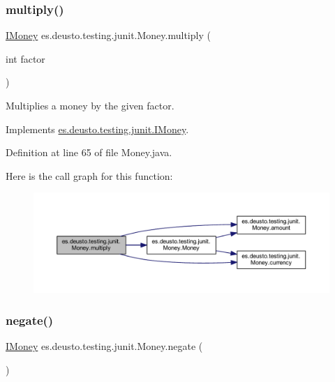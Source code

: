 \subsubsection{\texorpdfstring{multiply()}{multiply()}}
{\footnotesize\ttfamily \mbox{\hyperlink{interfacees_1_1deusto_1_1testing_1_1junit_1_1_i_money}{I\+Money}} es.\+deusto.\+testing.\+junit.\+Money.\+multiply (\begin{DoxyParamCaption}\item[{int}]{factor }\end{DoxyParamCaption})}

Multiplies a money by the given factor. 

Implements \mbox{\hyperlink{interfacees_1_1deusto_1_1testing_1_1junit_1_1_i_money_a09154f9713133d4734f72d6a20081209}{es.\+deusto.\+testing.\+junit.\+I\+Money}}.



Definition at line 65 of file Money.\+java.

Here is the call graph for this function\+:\nopagebreak
\begin{figure}[H]
\begin{center}
\leavevmode
\includegraphics[width=350pt]{classes_1_1deusto_1_1testing_1_1junit_1_1_money_a02c7d4e9013710f70d1d46e9c9ebae88_cgraph}
\end{center}
\end{figure}
\mbox{\label{classes_1_1deusto_1_1testing_1_1junit_1_1_money_ae5f0bc3ea87f1fd55d6478653b8f2e36}} 
\subsubsection{\texorpdfstring{negate()}{negate()}}
{\footnotesize\ttfamily \mbox{\hyperlink{interfacees_1_1deusto_1_1testing_1_1junit_1_1_i_money}{I\+Money}} es.\+deusto.\+testing.\+junit.\+Money.\+negate (\begin{DoxyParamCaption}{ }\end{DoxyParamCaption})}

